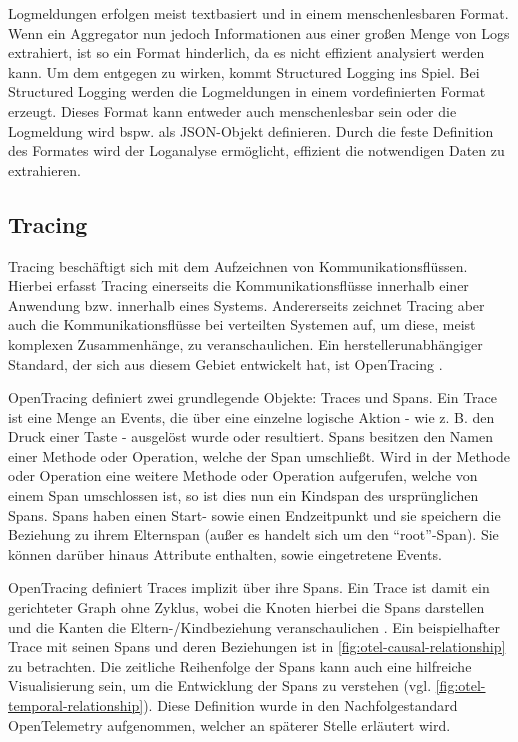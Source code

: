 Logmeldungen erfolgen meist textbasiert und in einem menschenlesbaren Format. Wenn ein Aggregator nun jedoch Informationen aus einer großen Menge von Logs extrahiert, ist so ein Format hinderlich, da es nicht effizient analysiert werden kann. Um dem entgegen zu wirken, kommt Structured Logging ins Spiel. Bei Structured Logging werden die Logmeldungen in einem vordefinierten Format erzeugt. Dieses Format kann entweder auch menschenlesbar sein oder die Logmeldung wird bspw. als JSON-Objekt definieren. Durch die feste Definition des Formates wird der Loganalyse ermöglicht, effizient die notwendigen Daten zu extrahieren.

\subsection{Tracing}
\label{sec:tracing}

Tracing beschäftigt sich mit dem Aufzeichnen von Kommunikationsflüssen. Hierbei erfasst Tracing einerseits die Kommunikationsflüsse innerhalb einer Anwendung bzw. innerhalb eines Systems. Andererseits zeichnet Tracing aber auch die Kommunikationsflüsse bei verteilten Systemen auf, um diese, meist komplexen Zusammenhänge, zu veranschaulichen. Ein herstellerunabhängiger Standard, der sich aus diesem Gebiet entwickelt hat, ist OpenTracing \cite{OpenTracing}.

OpenTracing definiert zwei grundlegende Objekte: Traces und Spans. Ein Trace ist eine Menge an Events, die über eine einzelne logische Aktion - wie z. B. den Druck einer Taste - ausgelöst wurde oder resultiert. Spans besitzen den Namen einer Methode oder Operation, welche der Span umschließt. Wird in der Methode oder Operation eine weitere Methode oder Operation aufgerufen, welche von einem Span umschlossen ist, so ist dies nun ein Kindspan des ursprünglichen Spans. Spans haben einen Start- sowie einen Endzeitpunkt und sie speichern die Beziehung zu ihrem Elternspan (außer es handelt sich um den \enquote{root}-Span). Sie können darüber hinaus Attribute enthalten, sowie eingetretene Events.

OpenTracing definiert Traces implizit über ihre Spans. Ein Trace ist damit ein gerichteter Graph ohne Zyklus, wobei die Knoten hierbei die Spans darstellen und die Kanten die Eltern-/Kindbeziehung veranschaulichen \cite{OpenTracingSpecification}. Ein beispielhafter Trace mit seinen Spans und deren Beziehungen ist in \autoref{fig:otel-causal-relationship} zu betrachten. Die zeitliche Reihenfolge der Spans kann auch eine hilfreiche Visualisierung sein, um die Entwicklung der Spans zu verstehen (vgl. \autoref{fig:otel-temporal-relationship}). Diese Definition wurde in den Nachfolgestandard OpenTelemetry aufgenommen, welcher an späterer Stelle erläutert wird.

